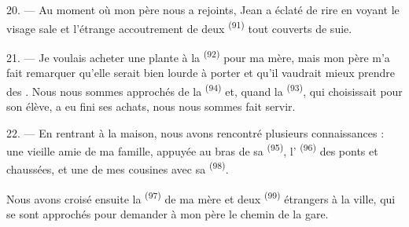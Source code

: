 \VUsaut{3.0mm}

20. --- Au moment où mon père nous a rejoints, Jean a éclaté de rire en voyant
le visage sale et l'étrange accoutrement de deux 
\textsuperscript{(91)} tout couverts de suie.

21. --- Je voulais acheter une plante à la 
\textsuperscript{(92)} pour ma mère, mais mon père m'a fait remarquer qu'elle
serait bien lourde à porter et qu'il vaudrait mieux prendre des
. Nous nous sommes approchés de la 
\textsuperscript{(94)} et, quand la  \textsuperscript{(93)},
qui choisissait pour son élève, a eu fini ses achats, nous nous sommes fait
servir.

22. --- En rentrant à la maison, nous avons rencontré plusieurs connaissances :
une vieille amie de ma famille, appuyée au bras de sa 
\textsuperscript{(95)}, l' \textsuperscript{(96)} des ponts et
chaussées, et une de mes cousines avec sa 
\textsuperscript{(98)}.

Nous avons croisé ensuite la  \textsuperscript{(97)} de ma mère
et deux  \textsuperscript{(99)} étrangers à la ville, qui se sont
approchés pour demander à mon père le chemin de la gare.
\VUsaut{6.0mm}
\VUfilet{22mm}
